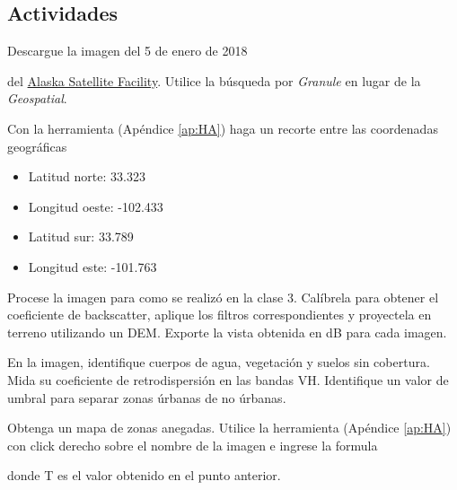 \subsection{Actividades}

\begin{que}
    Descargue la imagen del 5 de enero de 2018
    \begin{center}\end{center}
      del \href{https://vertex.daac.asf.alaska.edu/}{Alaska Satellite Facility}. Utilice la búsqueda por \emph{Granule} en lugar de la \emph{Geospatial}.
\end{que}

\begin{que}
    Con la herramienta  (Apéndice \ref{ap:HA}) haga un recorte entre las coordenadas geográficas
    \begin{itemize}
        \item Latitud norte: 33.323
        \item Longitud oeste: -102.433
        \item Latitud sur: 33.789
        \item Longitud este: -101.763
    \end{itemize}
\end{que}

\begin{que}
    Procese la imagen para como se realizó en la clase 3. Calíbrela para obtener el coeficiente de backscatter, aplique los filtros correspondientes y proyectela en terreno utilizando un DEM. Exporte la vista obtenida en dB para cada imagen.
\end{que}

\begin{que}
    En la imagen, identifique cuerpos de agua, vegetación y suelos sin cobertura. Mida su coeficiente de retrodispersión en las bandas VH. Identifique un valor de umbral para separar zonas úrbanas de no úrbanas.
\end{que}

\begin{que}
  Obtenga un mapa de zonas anegadas. Utilice la herramienta  (Apéndice \ref{ap:HA}) con click derecho sobre el nombre de la imagen e ingrese la formula
  \begin{center}
  \end{center}
  donde T es el valor obtenido en el punto anterior.
\end{que}

